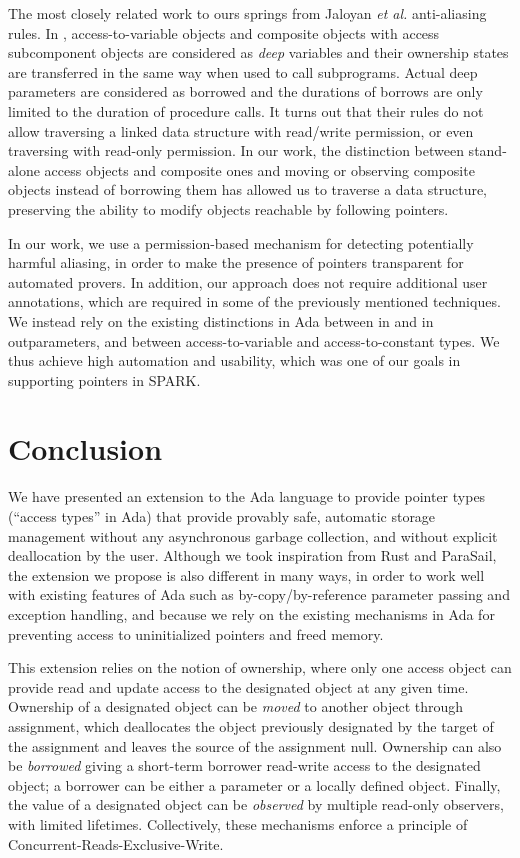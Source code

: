 \documentclass{llncs}
\newcommand{\keyword}[1]{\textsf{#1}}
\begin{document}
The most closely related work to ours springs from Jaloyan \textit{et al.} \cite{Jaloyan18} anti-aliasing rules. In \cite{Jaloyan18}, access-to-variable objects
and composite objects with access subcomponent objects are considered as \textit{deep} variables and their ownership states are transferred in the same way when used to call subprograms.
Actual deep parameters are considered as borrowed and the durations of borrows are only limited to the duration of procedure calls.
It turns out that their rules do not allow traversing a linked data structure with read/write permission, or even traversing with read-only permission. In our work, the distinction between stand-alone access
objects and composite ones and moving or observing composite objects instead of borrowing them has allowed us to traverse a data structure, preserving the ability to modify objects reachable by following pointers.

In our work, we use a permission-based mechanism for detecting potentially harmful aliasing, in order to make the presence of pointers transparent for automated provers.
In addition, our approach does not require additional user annotations, which are required in some of the previously mentioned techniques.  We instead rely on the existing distinctions in Ada between \keyword{in} and \keyword{in out}parameters, and between access-to-variable and access-to-constant types. We thus achieve high automation
and usability, which was one of our goals in supporting pointers in SPARK.


\section{Conclusion}
We have presented an extension to the Ada language to provide pointer types (``access types'' in Ada) that provide provably safe, automatic
storage management without any asynchronous garbage collection, and without explicit deallocation by the user. Although we took inspiration
from Rust and ParaSail, the extension we propose is also different in many ways, in order to work well with existing features of Ada such
as by-copy/by-reference parameter passing and exception handling, and because we rely on the existing mechanisms in Ada for preventing access
to uninitialized pointers and freed memory.

This extension relies on the notion of ownership, where only one access object can provide read and update access to the designated object at any given time.
Ownership of a designated object can be \textit{moved} to another object through assignment, which deallocates the object previously designated
by the target of the assignment and leaves the source of the assignment null. Ownership can also be \textit{borrowed} giving a short-term borrower read-write access to the designated object; a borrower
can be either a parameter or a locally defined object. Finally, the value of a designated object can be \textit{observed} by multiple
read-only observers, with limited lifetimes. Collectively, these mechanisms enforce a principle of Concurrent-Reads-Exclusive-Write.
\end{document}
